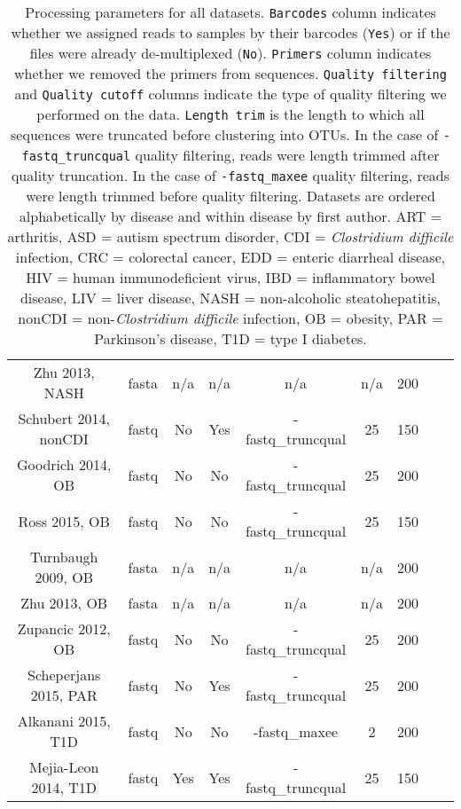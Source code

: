 {\begin{table}[h]
{\begin{tabular}{c c c c c c c c c}
	Zhu 2013, NASH & fasta & n/a & n/a & n/a & n/a & 200 \\
	Schubert 2014, nonCDI & fastq & No & Yes & -fastq\_truncqual & 25 & 150 \\
	Goodrich 2014, OB & fastq & No & No & -fastq\_truncqual & 25 & 200 \\
	Ross 2015, OB & fastq & No & No & -fastq\_truncqual & 25 & 150 \\
	Turnbaugh 2009, OB & fasta & n/a & n/a & n/a & n/a & 200 \\
	Zhu 2013, OB & fasta & n/a & n/a & n/a & n/a & 200 \\
	Zupancic 2012, OB & fastq & No & No & -fastq\_truncqual & 25 & 200 \\
	Scheperjans 2015, PAR & fastq & No & Yes & -fastq\_truncqual & 25 & 200 \\
	Alkanani 2015, T1D & fastq & No & No & -fastq\_maxee & 2 & 200 \\
	Mejia-Leon 2014, T1D & fastq & Yes & Yes & -fastq\_truncqual & 25 & 150 \\
	\hline
\end{tabular}}
\caption{Processing parameters for all datasets. \texttt{Barcodes} column indicates whether we assigned reads to samples by their barcodes (\texttt{Yes}) or if the files were already de-multiplexed (\texttt{No}). \texttt{Primers} column indicates whether we removed the primers from sequences. \texttt{Quality filtering} and \texttt{Quality cutoff} columns indicate the type of quality filtering we performed on the data. \texttt{Length trim} is the length to which all sequences were truncated before clustering into OTUs. In the case of \texttt{-fastq\_truncqual} quality filtering, reads were length trimmed after quality truncation. In the case of \texttt{-fastq\_maxee} quality filtering, reads were length trimmed before quality filtering. Datasets are ordered alphabetically by disease and within disease by first author. ART = arthritis, ASD = autism spectrum disorder, CDI = \textit{Clostridium difficile} infection, CRC = colorectal cancer, EDD = enteric diarrheal disease, HIV = human immunodeficient virus, IBD = inflammatory bowel disease, LIV = liver disease, NASH = non-alcoholic steatohepatitis, nonCDI = non-\textit{Clostridium difficile} infection, OB = obesity, PAR = Parkinson's disease, T1D = type I diabetes.}\label{tab:processing}
\end{table}
}

\FloatBarrier

